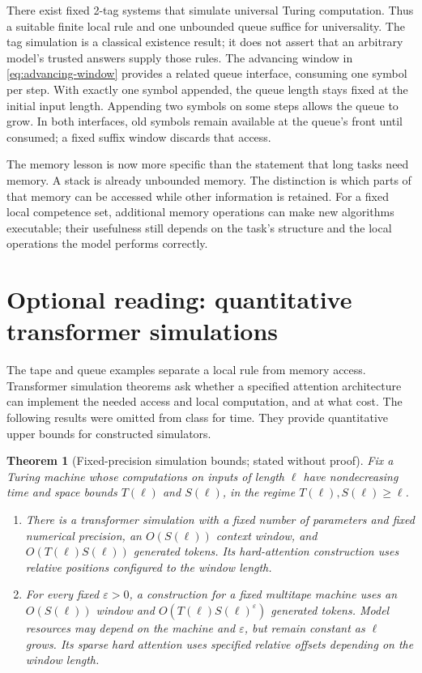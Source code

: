 \documentclass[11pt,twoside]{article}
\newtheorem{theorem}{Theorem}[section]
\theoremstyle{definition}
\theoremstyle{remark}
\begin{document}
There exist fixed 2-tag systems that simulate universal Turing computation.
Thus a suitable finite local rule and one unbounded queue suffice for
universality. The tag simulation is a classical existence result; it does
not assert that an arbitrary model's trusted answers supply those rules.
The advancing window in \eqref{eq:advancing-window} provides a related queue
interface, consuming one symbol per step. With exactly one symbol appended,
the queue length stays fixed at the initial input length. Appending two
symbols on some steps allows the queue to grow. In both interfaces, old
symbols remain available at the queue's front until consumed; a fixed
suffix window discards that access.

The memory lesson is now more specific than the statement that long tasks
need memory. A stack is already unbounded memory. The distinction is which
parts of that memory can be accessed while other information is retained.
For a fixed local competence set, additional memory operations can make
new algorithms executable; their usefulness still depends on the task's
structure and the local operations the model performs correctly.

\section{Optional reading: quantitative transformer simulations}
\label{sec:optional}

The tape and queue examples separate a local rule from memory access.
Transformer simulation theorems ask whether a specified attention
architecture can implement the needed access and local computation, and at
what cost. The following results were omitted from class for time. They
provide quantitative upper bounds for constructed simulators.

\begin{theorem}[Fixed-precision simulation bounds; stated without proof]
\label{thm:transformer-simulation}
Fix a Turing machine whose computations on inputs of length $\ell$ have
nondecreasing time and space bounds $T(\ell)$ and $S(\ell)$, in the regime
$T(\ell),S(\ell)\geq\ell$.
\begin{enumerate}[label=(\roman*),leftmargin=*]
\item There is a transformer simulation with a fixed number of parameters
and fixed numerical precision, an $O(S(\ell))$ context window, and
$O(T(\ell)S(\ell))$ generated tokens. Its hard-attention construction
uses relative positions configured to the window length.
\item For every fixed $\varepsilon>0$, a construction for a fixed multitape
machine uses an $O(S(\ell))$ window and
$O(T(\ell)S(\ell)^\varepsilon)$ generated tokens. Model resources may
depend on the machine and $\varepsilon$, but remain constant as $\ell$
grows. Its sparse hard attention uses specified relative offsets depending
on the window length.
\end{enumerate}
\end{theorem}
\end{document}

